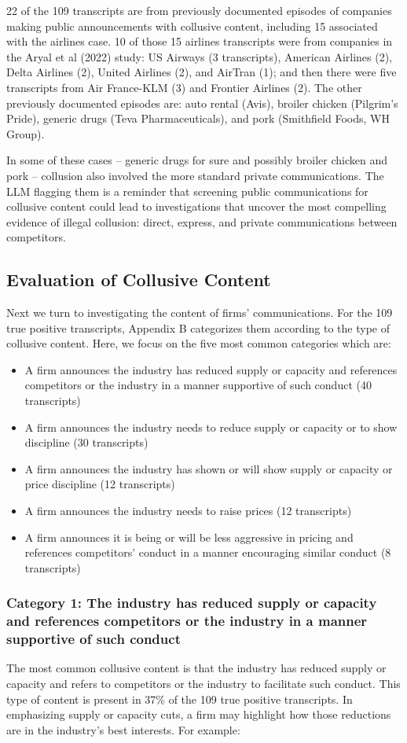 22 of the 109 transcripts are from previously documented episodes of companies making public announcements with collusive content, including 15 associated with the airlines case. 10 of those 15 airlines transcripts were from companies in the Aryal et al (2022) study: US Airways (3 transcripts), American Airlines (2), Delta Airlines (2), United Airlines (2), and AirTran (1); and then there were five transcripts from Air France-KLM (3) and Frontier Airlines (2). The other previously documented episodes are: auto rental (Avis), broiler chicken (Pilgrim’s Pride), generic drugs (Teva Pharmaceuticals), and pork (Smithfield Foods, WH Group).

In some of these cases – generic drugs for sure and possibly broiler chicken and pork – collusion also involved the more standard private communications. The LLM flagging them is a reminder that screening public communications for collusive content could lead to investigations that uncover the most compelling evidence of illegal collusion: direct, express, and private communications between competitors.

\subsection{Evaluation of Collusive Content}
Next we turn to investigating the content of firms’ communications. For the 109 true positive transcripts, Appendix B categorizes them according to the type of collusive content. Here, we focus on the five most common categories which are:
\begin{itemize}
    \item A firm announces the industry has reduced supply or capacity and references competitors or the industry in a manner supportive of such conduct (40 transcripts)
    \item A firm announces the industry needs to reduce supply or capacity or to show discipline (30 transcripts)
    \item A firm announces the industry has shown or will show supply or capacity or price discipline (12 transcripts)
    \item A firm announces the industry needs to raise prices (12 transcripts)
    \item A firm announces it is being or will be less aggressive in pricing and references competitors’ conduct in a manner encouraging similar conduct (8 transcripts)
\end{itemize}

\subsubsection{Category 1: The industry has reduced supply or capacity and references competitors or the industry in a manner supportive of such conduct}
The most common collusive content is that the industry has reduced supply or capacity and refers to competitors or the industry to facilitate such conduct. This type of content is present in 37\% of the 109 true positive transcripts. In emphasizing supply or capacity cuts, a firm may highlight how those reductions are in the industry’s best interests. For example:

